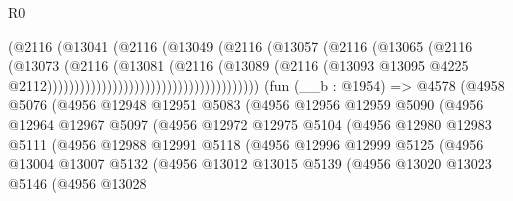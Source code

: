 \begin{lexlean}{R0}
\begin{coremodule}
                                                  (@2116
                                                    (@13041
                                                      (@2116
                                                        (@13049
                                                          (@2116
                                                            (@13057
                                                              (@2116
                                                                (@13065
                                                                  (@2116
                                                                    (@13073
                                                                      (@2116
                                                                        (@13081
                                                                          (@2116
                                                                            (@13089
                                                                              (@2116
                                                                                (@13093
                                                                                  @13095
                                                                                  @4225
                                                                                  @2112)))))))))))))))))))))))))))))))))))))))
    (fun (__b : @1954) =>
    @4578
      (@4958
        @5076
        (@4956
          @12948
          @12951
          @5083
          (@4956
            @12956
            @12959
            @5090
            (@4956
              @12964
              @12967
              @5097
              (@4956
                @12972
                @12975
                @5104
                (@4956
                  @12980
                  @12983
                  @5111
                  (@4956
                    @12988
                    @12991
                    @5118
                    (@4956
                      @12996
                      @12999
                      @5125
                      (@4956
                        @13004
                        @13007
                        @5132
                        (@4956
                          @13012
                          @13015
                          @5139
                          (@4956
                            @13020
                            @13023
                            @5146
                            (@4956
                              @13028

\end{coremodule}
\end{lexlean}

